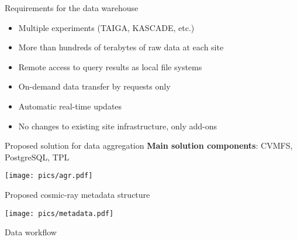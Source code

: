 
\begin{frame}{Requirements for the data warehouse}
  \begin{itemize}
    \item Multiple experiments (TAIGA, KASCADE, etc.)
    \item More than hundreds of terabytes of raw data at each site
    \item Remote access to query results as local file systems
    \item  On-demand data transfer by requests only
    \item  Automatic real-time updates
    \item  No changes to existing site infrastructure, only add-ons
  \end{itemize}
\end{frame}

\begin{frame}{Proposed solution for data aggregation}
\textbf{Main solution components}: CVMFS, PostgreSQL, TPL
    \begin{center}
        \texttt{[image: pics/agr.pdf]}
    \end{center}
\end{frame}


\begin{frame}{Proposed cosmic-ray metadata structure}
    \vspace{-1.5em}
    \begin{center}
        \texttt{[image: pics/metadata.pdf]}
    \end{center}
\end{frame}

\begin{frame}{Data workflow}
    \vspace{-2em}
    \centering
\end{frame}

